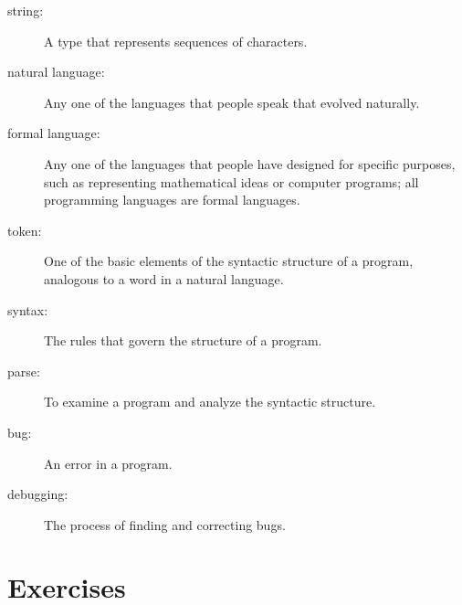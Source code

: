 \begin{description}
\item[string:] A type that represents sequences of characters.

\item[natural language:]  Any one of the languages that people speak that
evolved naturally.

\item[formal language:]  Any one of the languages that people have designed
for specific purposes, such as representing mathematical ideas or
computer programs; all programming languages are formal languages.

\item[token:]  One of the basic elements of the syntactic structure of
a program, analogous to a word in a natural language.

\item[syntax:] The rules that govern the structure of a program.

\item[parse:] To examine a program and analyze the syntactic structure.

\item[bug:] An error in a program.

\item[debugging:] The process of finding and correcting bugs.

\end{description}


\section{Exercises}


